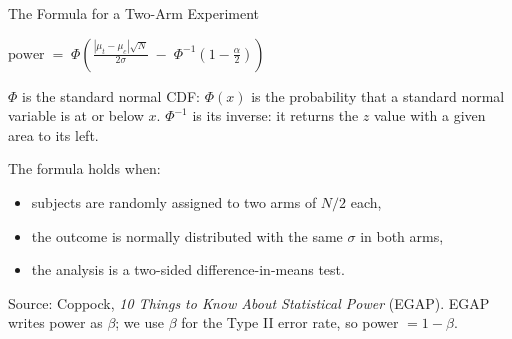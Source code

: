 \documentclass[
  ignorenonframetext,
  aspectratio=169,
]{beamer}
\providecommand{\tightlist}{%
  \setlength{\itemsep}{0pt}\setlength{\parskip}{0pt}}
\begin{document}
\begin{frame}{The Formula for a Two-Arm Experiment}
\label{the-formula-for-a-two-arm-experiment}
\vspace{0.2em}

\begin{center}
$\displaystyle \text{power} \;=\; \Phi\!\left( \frac{|\mu_t - \mu_c|\sqrt{N}}{2\sigma} \;-\; \Phi^{-1}\!\left(1-\frac{\alpha}{2}\right) \right)$
\end{center}

\vspace{0.6em}

\small

\(\Phi\) is the standard normal CDF: \(\Phi(x)\) is the probability that
a standard normal variable is at or below \(x\). \(\Phi^{-1}\) is its
inverse: it returns the \(z\) value with a given area to its left.

\vspace{0.6em}

The formula holds when:

\begin{itemize}
\tightlist
\item
  subjects are randomly assigned to two arms of \(N/2\) each,
\item
  the outcome is normally distributed with the same \(\sigma\) in both
  arms,
\item
  the analysis is a two-sided difference-in-means test.
\end{itemize}

\vspace{0.4em}

\scriptsize Source: Coppock,
\textit{10 Things to Know About Statistical Power} (EGAP). EGAP writes
power as \(\beta\); we use \(\beta\) for the Type II error rate, so
power \(= 1-\beta\).
\end{frame}
\end{document}
